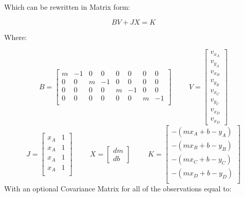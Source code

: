 Which can be rewritten in Matrix form:

\[
BV + JX = K
\]

Where:

\[
B = 
\begin{bmatrix}
m &  -1 &  0 &  0 &  0 &  0 &  0 &  0 \\
0 &  0 &  m &  -1 &  0 &  0 &  0 &  0 \\
0 &  0 &  0 &  0 &  m &  -1 &  0 &  0 \\
0 &  0 &  0 &  0 &  0 &  0 &  m &  -1 \\ 
\end{bmatrix}
\hspace{1cm}
V = 
\begin{bmatrix}
v_{x_A} \\ v_{y_A} \\ v_{x_B} \\ v_{y_B} \\ v_{x_C} \\ v_{y_C} \\ v_{x_D} \\ v_{x_D}
\end{bmatrix}
\]
\[
J =
\begin{bmatrix}
x_A & 1 \\
x_A & 1 \\
x_A & 1 \\
x_A & 1 \\
\end{bmatrix}
\hspace{1cm}
X =
\begin{bmatrix}
dm \\ db
\end{bmatrix}
\hspace{1cm}
K = 
\begin{bmatrix}
- (mx_A+b-y_A) \\
- (mx_B+b-y_B) \\
- (mx_C+b-y_C) \\
- (mx_D+b-y_D) \\
\end{bmatrix}
\]
With an optional Covariance Matrix for all of the observations equal to:
